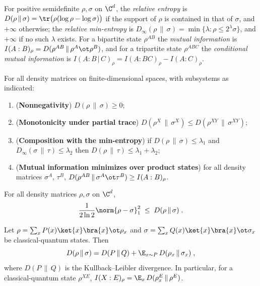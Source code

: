 \begin{definition}
\label{def:rel-entropy}
\qlib{}
For positive semidefinite $\rho, \sigma$ on $\C^d$, the \emph{relative entropy} is
$D(\rho \,\|\, \sigma) = \tr\bigl(\rho (\log\rho - \log\sigma)\bigr)$ if the support
of $\rho$ is contained in that of $\sigma$, and $+\infty$ otherwise; the
\emph{relative min-entropy} is $D_\infty(\rho \,\|\, \sigma) = \min\{\lambda : \rho
\leq 2^\lambda \sigma\}$, and $+\infty$ if no such $\lambda$ exists. For a bipartite
state $\rho^{AB}$ the \emph{mutual information} is $I(A : B)_\rho = D(\rho^{AB} \,\|\,
\rho^A \ot \rho^B)$, and for a tripartite state $\rho^{ABC}$ the \emph{conditional
mutual information} is $I(A : B \,|\, C)_\rho = I(A : BC)_\rho - I(A : C)_\rho$.
\end{definition}

\begin{lemma}
\label{lem:rel-ent-basic}
\qlib{}
For all density matrices on finite-dimensional spaces, with subsystems as indicated:
\begin{enumerate}
\item (\textbf{Nonnegativity}) $D(\rho \,\|\, \sigma) \geq 0$;
\item (\textbf{Monotonicity under partial trace}) $D(\rho^{X} \,\|\, \sigma^{X}) \leq
  D(\rho^{XY} \,\|\, \sigma^{XY})$;
\item (\textbf{Composition with the min-entropy}) if $D(\rho \,\|\, \sigma) \leq
  \lambda_1$ and $D_\infty(\sigma \,\|\, \tau) \leq \lambda_2$ then $D(\rho \,\|\,
  \tau) \leq \lambda_1 + \lambda_2$;
\item (\textbf{Mutual information minimizes over product states}) for all density
  matrices $\sigma^A$, $\tau^B$,
  $D(\rho^{AB} \,\|\, \sigma^A \ot \tau^B) \geq I(A : B)_\rho$.
\end{enumerate}
\end{lemma}

\begin{lemma}
\label{lem:q-pinsker}
\qlib{}
For all density matrices $\rho, \sigma$ on $\C^d$,
\begin{equation*}
  \frac{1}{2 \ln 2} \norm{\rho - \sigma}_1^2 \;\leq\; D(\rho \,\|\, \sigma)\;.
\end{equation*}
\end{lemma}

\begin{lemma}
\label{lem:rel-ent-chain}
\qlib{}
Let $\rho = \sum_x P(x) \ket{x}\bra{x} \ot \rho_x$ and $\sigma = \sum_x Q(x)
\ket{x}\bra{x} \ot \sigma_x$ be classical-quantum states. Then
\begin{equation*}
  D(\rho \,\|\, \sigma) = D(P \,\|\, Q) + \E_{x \sim P} \, D(\rho_x \,\|\, \sigma_x)\;,
\end{equation*}
where $D(P \,\|\, Q)$ is the Kullback--Leibler divergence. In particular, for a
classical-quantum state $\rho^{XE}$, $I(X : E)_\rho = \E_{x} \, D(\rho^E_x \,\|\,
\rho^E)$.
\end{lemma}

